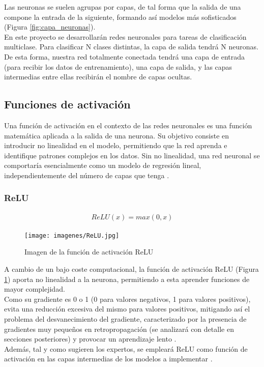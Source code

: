 Las neuronas se suelen agrupas por capas, de tal forma que la salida de una compone la entrada de la siguiente, formando así modelos más sofisticados (Figura \ref{fig:capa_neuronas}). \\
En este proyecto se desarrollarán redes neuronales para tareas de clasificación multiclase. Para clasificar N clases distintas, la capa de salida tendrá N neuronas. De esta forma, nuestra red totalmente conectada tendrá una capa de entrada (para recibir los datos de entrenamiento), una capa de salida, y las capas intermedias entre ellas recibirán el nombre de capas ocultas. 

\subsection{Funciones de activación}

Una función de activación en el contexto de las redes neuronales es una función matemática aplicada a la salida de una neurona. Su objetivo consiste en introducir no linealidad en el modelo, permitiendo que la red aprenda e identifique patrones complejos en los datos. Sin no linealidad, una red neuronal se comportaría esencialmente como un modelo de regresión lineal, independientemente del número de capas que tenga \cite{funcion_activacion_definicion}.

\subsubsection{ReLU}

\begin{gather}
	ReLU(x) = max(0, x)
\end{gather}

\begin{figure}[H]
	\centering
	\texttt{[image: imagenes/ReLU.jpg]}  
	\caption{Imagen de la función de activación ReLU}
	\label{fig:ReLU}
\end{figure}

A cambio de un bajo coste computacional, la función de activación ReLU (Figura \ref{fig:ReLU}) aporta no linealidad a la neurona, permitiendo a esta aprender funciones de mayor complejidad. \\
Como su gradiente es 0 o 1 (0 para valores negativos, 1 para valores positivos), evita una reducción excesiva del mismo para valores positivos, mitigando así el problema del desvanecimiento del gradiente, caracterizado por la presencia de gradientes muy pequeños en retropropagación (se analizará con detalle en secciones posteriores) y provocar un aprendizaje lento \cite{ReLU}. \\
Además, tal y como sugieren los expertos, se empleará ReLU como función de activación en las capas intermedias de los modelos a implementar \cite{importancia_ReLU} \cite{importancia_ReLU_2}. 

